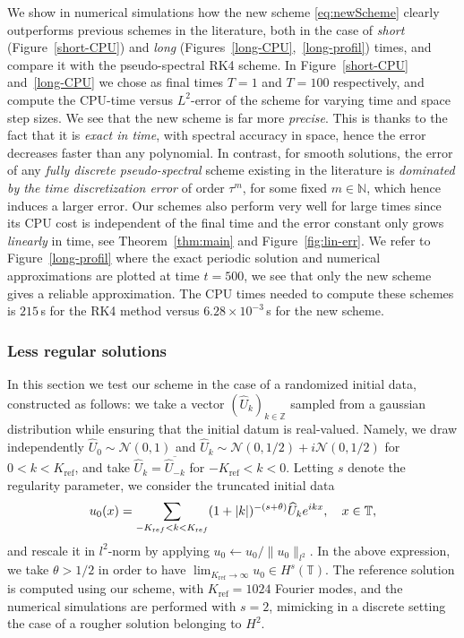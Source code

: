 \documentclass [11pt] {article}
\begin{document}
We show in numerical simulations how the new scheme \eqref{eq:newScheme} clearly outperforms previous schemes in the literature, both in the case of {\it short} (Figure~\ref{short-CPU}) and {\it long} (Figures~\ref{long-CPU},~\ref{long-profil}) times, and compare it with the pseudo-spectral RK4 scheme. In Figure~\ref{short-CPU} and~\ref{long-CPU} we chose as final times $T=1$ and $T=100$ respectively, and compute the CPU-time versus $L^2$-error of the scheme for varying time and space step sizes. We see that the new scheme is far more {\it precise}. This is thanks to the fact that it is {\it exact in time}, with spectral accuracy in space, hence the error decreases faster than any polynomial. In contrast, for smooth solutions, the error of any {\it fully discrete pseudo-spectral} scheme existing in the literature is {\it dominated by the time discretization error} of order $\tau^m$, for some fixed $m\in \mathbb{N}$, which hence induces a larger error.
Our schemes also perform very well for large times since its CPU cost is independent of the final time and the error constant only grows {\it linearly} in time, see Theorem~\ref{thm:main} and Figure~\ref{fig:lin-err}.
We refer to Figure~\ref{long-profil} where the exact periodic solution and numerical approximations are plotted at time $t=500$, we see that only the new scheme gives a reliable approximation. The CPU times needed to compute these schemes is $215$\,s for the RK4 method versus $6.28\times10^{-3}$\,s for the new scheme. 


\subsubsection{Less regular solutions}\label{sec:num-rough}
In this section we test our scheme in the case of a randomized initial data, constructed as follows:
we take a vector $(\widehat{U}_{k})_{k\in \mathbb Z}$ sampled from a gaussian distribution while ensuring that the initial datum is real-valued. Namely, we draw independently $\widehat{U}_0 \sim \mathcal{N}(0,1)$ and  $\widehat{U}_k \sim \mathcal{N}(0,1/2)+ i\mathcal{N}(0,1/2)$ for $0<k < K_{\text{ref}}$, and take $\widehat{U}_{k} = \overline{\widehat{U}_{-k}}$ for $-K_{\text{ref}}< k < 0$. Letting $s$ denote the regularity parameter, we consider the truncated initial data
\begin{equation}
\label{eq:randomID}
u_{0}(x) = \sum_{-K_{\text ref}< k< K_{\text ref}} (1+|k|)^{-(s+\theta)}\widehat{U}_{k} e^{ikx}, \quad x\in \mathbb T,
\end{equation}
and rescale it in $l^2$-norm by applying $u_{0} \leftarrow u_{0}/\| u_{0}\|_{l^2}$. In the above expression, we take $\theta > 1/2$ in order to have $\lim_{K_{\text{ref}}\to \infty}u_{0} \in H^s(\mathbb{T})$. The reference solution is computed using our scheme, with $K_{\text{ref}} = 1024$ Fourier modes,
and the numerical simulations are performed with $s=2$, mimicking in a discrete setting the case of a rougher solution belonging to $H^2$.
\end{document}
